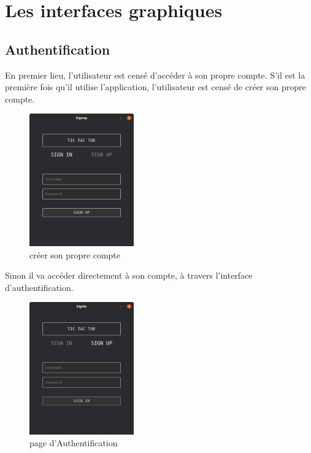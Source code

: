 \section{Les interfaces graphiques}\label{sec:section2}
\subsection{Authentification}
	En premier lieu, l’utilisateur est censé d’accéder à son propre compte.
S’il est la première fois qu’il utilise l’application, l’utilisateur est censé de créer son propre compte.
\begin{figure}[H]
	\centering
	\includegraphics[width=0.4\textwidth]{sign up.PNG}
	  \caption{créer son propre compte}
	\label{fig:créer son propre compte}
\end{figure}
Sinon il va accéder directement à son compte, à travers l’interface d’authentification.
\begin{figure}[H]
	\centering
	\includegraphics[width=0.4\textwidth]{sign in page .PNG}
	  \caption{page d'Authentification}
	\label{fig:page d'Authentification}
\end{figure}
